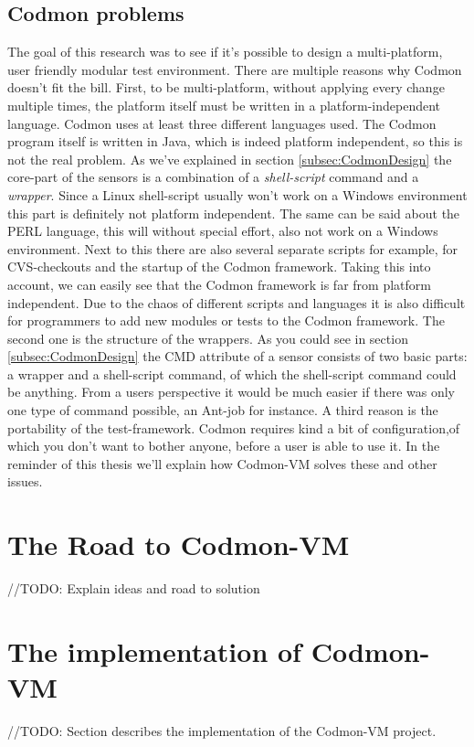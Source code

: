 \documentclass[a4paper,10pt]{scrartcl}
\newcommand{\project}{Codmon-VM}
\begin{document}
\subsection{Codmon problems}
\label{subsec:CodmonProblems}
The goal of this research was to see if it's possible to design a multi-platform, user friendly modular test environment. There are multiple reasons why Codmon doesn't fit the bill. First,
to be multi-platform, without applying every change multiple times, the platform itself must be written in a platform-independent language. Codmon uses at least three 
different languages used. The Codmon program itself is written in Java, which is indeed platform independent\cite{Java}, so this is not the real problem. As we've explained in section \ref{subsec:CodmonDesign} the
core-part of the sensors is a combination of a \emph{shell-script} command and a \emph{wrapper}. Since a Linux shell-script usually won't work on a Windows environment this part is definitely
not platform independent. The same can be said about the PERL language, this will without special effort, also not work on a Windows environment. Next to this there are also several separate
scripts for example, for  CVS-checkouts and the startup of the Codmon framework. Taking this into account, we can easily see that the Codmon framework is far from platform independent. Due to the chaos of 
different scripts and languages it is also difficult for programmers to add new modules or tests to the Codmon framework. The second one is the structure of the wrappers. As you could see in 
section \ref{subsec:CodmonDesign} the CMD attribute of a sensor consists of two basic parts: a wrapper and a shell-script command, of which the shell-script command could be anything. From a users 
perspective it would be much easier if there was only one type of command possible, an Ant-job for instance. A third reason is the portability of the test-framework. Codmon requires kind a bit
of configuration,of which you don't want to bother anyone, before a user is able to use it. In the reminder of this thesis we'll explain how \project{} solves these and other issues. 

\newpage
\section{The Road to \project{}}
\label{sec:road}

//TODO: Explain ideas and road to solution

\newpage
\section{The implementation of \project{}}
\label{sec:Codmon2.0}
//TODO: Section describes the implementation of the \project{} project.
\end{document}
